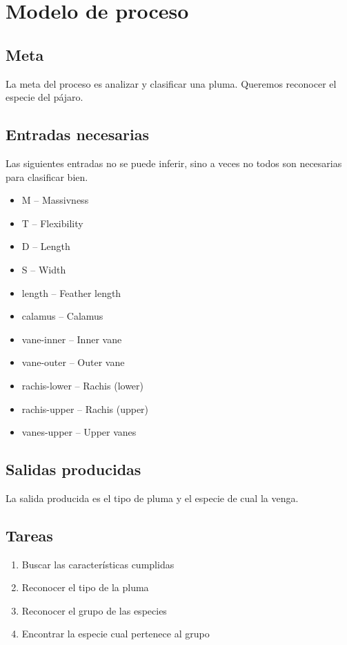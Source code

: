 \documentclass[a4paper,12pt]{article}
\begin{document}
\section{Modelo de proceso}
\subsection{Meta}
La meta del proceso es analizar y clasificar una pluma. Queremos reconocer el especie del pájaro.

\subsection{Entradas necesarias}
Las siguientes entradas no se puede inferir, sino a veces no todos son necesarias para clasificar bien.
\begin{itemize}
	\item M -- Massivness
	\item T -- Flexibility
	\item D -- Length
	\item S -- Width
	\item length -- Feather length
	\item calamus -- Calamus
	\item vane-inner -- Inner vane
	\item vane-outer -- Outer vane
	\item rachis-lower -- Rachis (lower)
	\item rachis-upper -- Rachis (upper)
	\item vanes-upper -- Upper vanes
\end{itemize}

\subsection{Salidas producidas}
La salida producida es el tipo de pluma y el especie de cual la venga.

\subsection{Tareas}
\begin{enumerate}
	\item Buscar las características cumplidas
	\item Reconocer el tipo de la pluma
	\item Reconocer el grupo de las especies
	\item Encontrar la especie cual pertenece al grupo
\end{enumerate}
\end{document}
